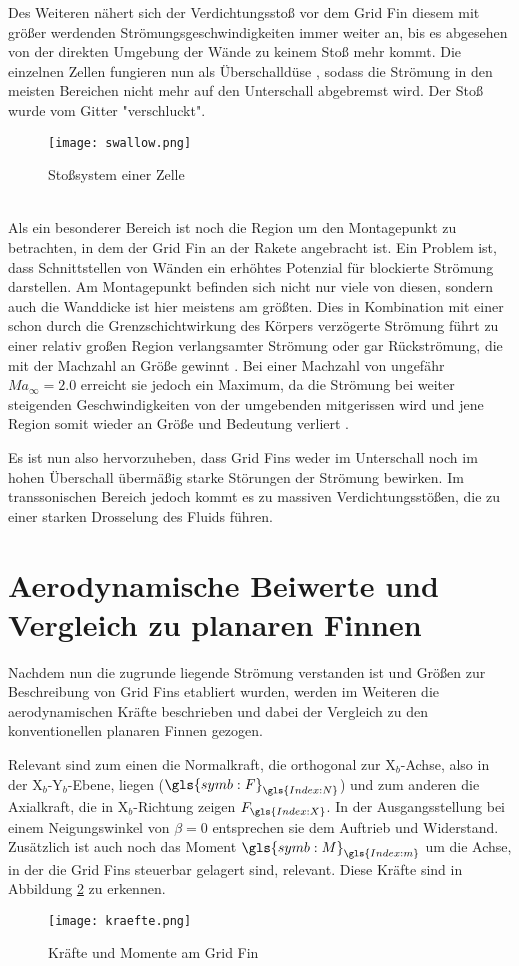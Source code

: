 Des Weiteren nähert sich der Verdichtungsstoß vor dem Grid Fin diesem mit größer werdenden Strömungsgeschwindigkeiten immer weiter an, bis es abgesehen von der direkten Umgebung der Wände zu keinem Stoß mehr kommt. Die einzelnen Zellen fungieren nun als Überschalldüse \cite{stroemung}, sodass die Strömung in den meisten Bereichen nicht mehr auf den Unterschall abgebremst wird. Der Stoß wurde vom Gitter "verschluckt".
\begin{figure}[h]
	\centering
	\texttt{[image: swallow.png]}
	\begin{flushright}
	\end{flushright}
	\caption{Stoßsystem einer Zelle}
	\label{abb_stoesse}
\end{figure}\\
Als ein besonderer Bereich ist noch die Region um den Montagepunkt zu betrachten, in dem der Grid Fin an der Rakete angebracht ist. Ein Problem ist, dass Schnittstellen von Wänden ein erhöhtes Potenzial für blockierte Strömung darstellen. Am Montagepunkt befinden sich nicht nur viele von diesen, sondern auch die Wanddicke ist hier meistens am größten. Dies in Kombination mit einer schon durch die Grenzschichtwirkung des Körpers verzögerte Strömung führt zu einer relativ großen Region verlangsamter Strömung oder gar Rückströmung, die mit der Machzahl an Größe gewinnt \cite{stroemung}. Bei einer Machzahl von ungefähr $Ma_\infty = 2.0$ erreicht sie jedoch ein Maximum, da die Strömung bei weiter steigenden Geschwindigkeiten von der umgebenden mitgerissen wird und jene Region somit wieder an Größe und Bedeutung verliert \cite{stroemung}.

Es ist nun also hervorzuheben, dass Grid Fins weder im Unterschall noch im hohen Überschall übermäßig starke Störungen der Strömung bewirken. Im transsonischen Bereich jedoch kommt es zu massiven Verdichtungsstößen, die zu einer starken Drosselung des Fluids führen.


\section{Aerodynamische Beiwerte und Vergleich zu planaren Finnen}
Nachdem nun die zugrunde liegende Strömung verstanden ist und Größen zur Beschreibung von Grid Fins etabliert wurden, werden im Weiteren die aerodynamischen Kräfte beschrieben und dabei der Vergleich zu den konventionellen planaren Finnen gezogen.

Relevant sind zum einen die Normalkraft, die orthogonal zur X$_b$-Achse, also in der X$_b$-Y$_b$-Ebene, liegen ($\gls{symb:F}_{\gls{Index:N}}$) und zum anderen die Axialkraft, die in X$_b$-Richtung zeigen $F_{\gls{Index:X}}$. In der Ausgangsstellung bei einem Neigungswinkel von $\beta = 0$ entsprechen sie dem Auftrieb und Widerstand. Zusätzlich ist auch noch das Moment $\gls{symb:M}_{\gls{Index:m}}$ um die Achse, in der die Grid Fins steuerbar gelagert sind, relevant. Diese Kräfte sind in Abbildung \ref{abb_kraefte} zu erkennen.
\begin{figure}[h]
	\centering
	\texttt{[image: kraefte.png]}
	\caption{Kräfte und Momente am Grid Fin}
	\label{abb_kraefte}
\end{figure}\\
